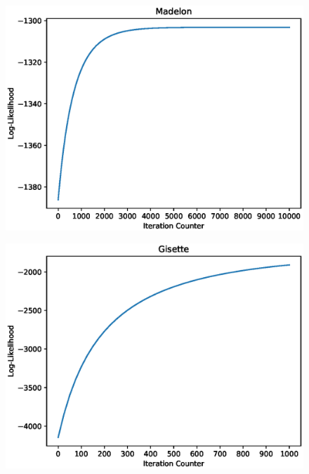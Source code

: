 \documentclass[UTF8]{article}
\begin{document}
\begin{figure}[H]
    \centering
    \includegraphics[scale=0.90]{./figures/madelon_10000_1.eps}
\end{figure}

\begin{figure}[H]
    \centering
    \includegraphics[scale=0.90]{./figures/gisette_500_1.eps}
\end{figure}


\end{document}
